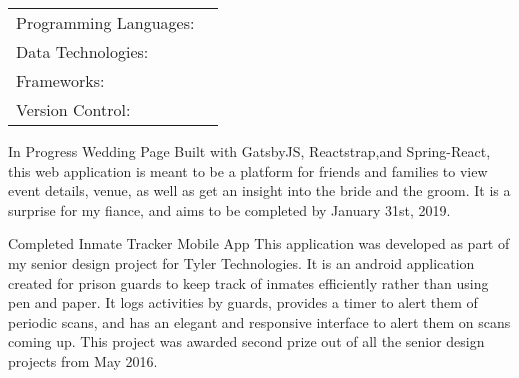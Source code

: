 \documentclass[]{awesome-cv}
\begin{document}

\begin{cventries}
\vspace{-2.5mm}
	\cventry
	{}
	{\def\arraystretch{1.15}{\begin{tabular}{ l l }
		Programming Languages:  & {\skill{ Java, Javascript, Python, C\#, C++, C, Groovy, Haskell}} \\
		Data Technologies:  & {\skill{ MySQL, PostgreSQL, Oracle SQL, IBM MQ, Rabbit MQ, ElasticSearch}} \\
		Frameworks:  & {\skill{ Spring, GatsbyJS, ReactJS, AngularJS, ASP.NET}} \\
		Version Control:  & {\skill{ SVN, GIT}} \\
		\end{tabular}}}
	{}
	{}
	{}
\end{cventries}

\vspace{-7mm}
\begin{cventries}
	\cventry
	{In Progress}
	{Wedding Page}
	{}
	{}
	{Built with GatsbyJS, Reactstrap,and Spring-React, this web application is meant to be a platform for friends and families to view event details, venue, as well as get an insight into the bride and the groom. It is a surprise for my fiance, and aims to be completed by January 31st, 2019.}	
	
\end{cventries}

\begin{cventries}
	\cventry
	{Completed}
	{Inmate Tracker Mobile App}
	{}
	{}
	{This application was developed as part of my senior design project for Tyler Technologies. It is an android application created for prison guards to keep track of inmates efficiently rather than using pen and paper.  It logs activities by guards, provides a timer to alert them of periodic scans, and has an elegant and responsive interface to alert them on scans coming up. This project was awarded second prize out of all the senior design projects from May 2016. }	
	\vspace{-5mm}
\end{cventries}

\ 
\end{document}
